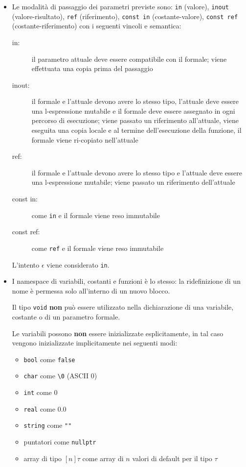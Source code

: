 \documentclass{report}
\newcommand{\term}[1]{\texttt{#1}}
\begin{document}
\begin {itemize}
    Le guardie di costrutti di iterazione indeterminata e condizionali devono avere tipo \term{bool}

    \item Le modalità di passaggio dei parametri previste sono: \term{in} (valore),
    \term{inout} (valore-risultato), \term{ref} (riferimento),
    \term{const in} (costante-valore), \term{const ref} (costante-riferimento) con i
    seguenti vincoli e semantica:
    \begin{description}
        \item[in:] il parametro attuale deve essere compatibile con il formale;
            viene effettuata una copia prima del passaggio
        \item[inout:] il formale e l'attuale devono avere lo stesso tipo, l'attuale
            deve essere una l-espressione mutabile e il formale deve essere assegnato
            in ogni percorso di esecuzione; viene passato un riferimento all'attuale,
            viene eseguita una copia locale e al termine dell'esecuzione della funzione,
            il formale viene ri-copiato nell'attuale
        \item[ref:] il formale e l'attuale devono avere lo stesso tipo e l'attuale deve
            essere una l-espressione mutabile; viene passato un riferimento dell'attuale
        \item[const in:] come \term{in} e il formale viene reso immutabile
        \item[const ref:] come \term{ref} e il formale viene reso immutabile

    \end{description}
    L'intento $\epsilon$ viene considerato \term{in}.

    \item I namespace di variabili, costanti e funzioni è lo stesso: la ridefinizione di un nome
    è permessa solo all'interno di un nuovo blocco.

    Il tipo \term{void} \textbf{non} può essere utilizzato nella dichiarazione di una variabile,
    costante o di un parametro formale.

    Le variabili possono \textbf{non} essere inizializzate esplicitamente, in tal caso
    vengono inizializzate implicitamente nei seguenti modi:
    \begin{itemize}
        \item \term{bool} come \term{false}
        \item \term{char} come \texttt{\textbackslash 0} (ASCII 0)
        \item \term{int} come 0
        \item \term{real} come 0.0
        \item \term{string} come \term{""}
        \item puntatori come \term{nullptr}
        \item array di tipo $[n]\tau$ come array di $n$ valori di default
            per il tipo $\tau$
        

\end{itemize}
\end{itemize}
\end{document}
